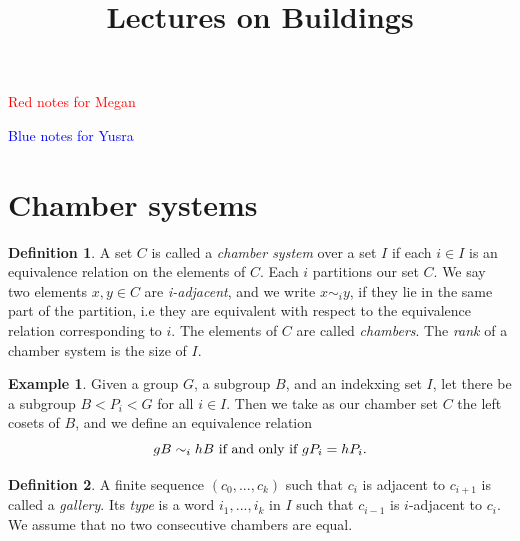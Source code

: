 \documentclass[11pt]{article}
\begin{document}
\newtheorem{theorem}{Theorem}
\theoremstyle{definition}
\newtheorem{definition}{Definition}
\newtheorem{proposition}{Proposition}
\newtheorem{example}{Example}
\newtheorem{lemma}{Lemma}
\newtheorem{corollary}{Corollary}
\newcommand{\uw}{\mathcal{U}(W,X)}
\newcommand{\W}{$(W,S)$}
\newcommand{\ix}{\textit}
\newcommand{\tr}{\textcolor{red}}
\newcommand{\sg}{$\Sigma$}


\title{Lectures on Buildings}
\maketitle
\tableofcontents 





\textcolor{red}{Red notes for Megan}

\textcolor{blue}{Blue notes for Yusra}

\section{Chamber systems}

\begin{definition}
    A set $C$ is called a \ix{chamber system} over a set $I$ if each $i\in I$ is an equivalence relation on the elements of $C$. Each $i$ partitions our set $C$. We say two elements $x,y\in C$ are \ix{i-adjacent}, and we write $x\sim_{i} y$, if they lie in the same part of the partition, i.e they are equivalent with respect to the equivalence relation corresponding to $i$. The elements of $C$ are called \ix{chambers}. The \ix{rank} of a chamber system is the size of $I$. 
\end{definition}




\begin{example}
    Given a group $G$, a subgroup $B$, and an indekxing set $I$, let there be a subgroup $B<P_i<G$ for all $i\in I$. Then we take as our chamber set $C$ the left cosets of $B$, and we define an equivalence relation
    \[gB\sim_{i}hB \textnormal{ if and only if }gP_i=hP_i.\]
\end{example}

\begin{definition}
    A finite sequence $(c_0,...,c_k)$ such that $c_i$ is adjacent to $c_{i+1}$ is called a \ix{gallery}. Its \ix{type} is a word $i_1,...,i_k$ in $I$ such that  $c_{i-1}$ is $i$-adjacent to $c_{i}$. We assume that no two consecutive chambers are equal.
\end{definition}
\end{document}
